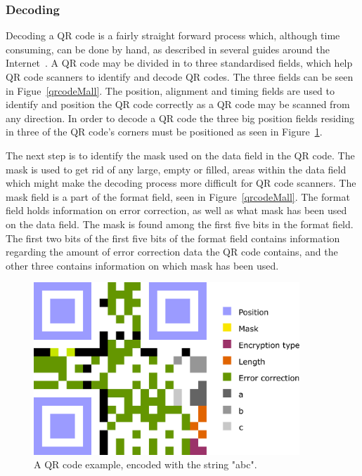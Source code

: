 \subsubsection{Decoding}
Decoding a QR code is a fairly straight forward process which, although time consuming, can be done by hand, as described in several guides around the Internet~\cite{qrcodeDecoding2, qrcodeDecoding, qrcodeDecoding3}. A QR code may be divided in to three standardised fields, which help QR code scanners to identify and decode QR codes. The three fields can be seen in Figue~\ref{qrcodeMall}. The position, alignment and timing fields are used to identify and position the QR code correctly as a QR code may be scanned from any direction. In order to decode a QR code the three big position fields residing in three of the QR code's corners must be positioned as seen in Figure~\ref{qrcodeExample}.

The next step is to identify the mask used on the data field in the QR code. The mask is used to get rid of any large, empty or filled, areas within the data field which might make the decoding process more difficult for QR code scanners. The mask field is a part of the format field, seen in Figure~\ref{qrcodeMall}. The format field holds information on error correction, as well as what mask has been used on the data field. The mask is found among the first five bits in the format field. The first two bits of the first five bits of the format field contains information regarding the amount of error correction data the QR code contains, and the other three contains information on which mask has been used.

	\begin{figure}[H]%
		\centering
		\includegraphics[width=100mm]{images/qrcodeexample}
		\caption{A QR code example, encoded with the string "abc".}
		\label{qrcodeExample}
	\end{figure}


